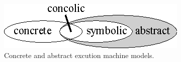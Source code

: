 
\begin{figure}[t]
\centering
\includegraphics[width=0.35\columnwidth]{images/concrete-abstract.eps} 
\caption{Concrete and abstract excution machine models.}
\label{fig:concrete-symbolic}
\end{figure}


